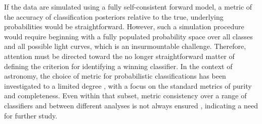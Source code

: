 If the data are simulated using a fully self-consistent forward model, a metric of the accuracy of classification posteriors relative to the true, underlying probabilities would be straightforward.
However, such a simulation procedure would require beginning with a fully populated probability space over all classes and all possible light curves, which is an insurmountable challenge.
Therefore, attention must be directed toward the no longer straightforward matter of defining the criterion for identifying a winning classifier.
In the context of astronomy, the choice of metric for probabilistic classifications has been investigated to a limited degree \citep{florios_forecasting_2018, kim_stargalaxy_2017},
with a focus on the standard metrics of purity and completeness.
Even within that subset, metric consistency over a range of classifiers and between different analyses is not always ensured \citep{bethapudi_separation_2018}, indicating a need for further study.


